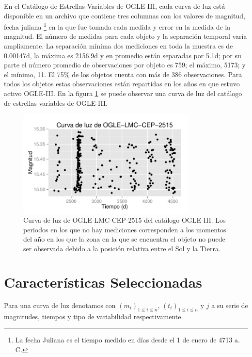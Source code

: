 \documentclass[letterpaper,12pt]{book}
\begin{document}
En el Catálogo de Estrellas Variables de OGLE-III, cada curva de luz está disponible en un archivo que contiene tres columnas con los valores de magnitud, fecha juliana \footnote{La fecha Juliana es el tiempo medido en días desde el 1 de enero de 4713 a. C.} en la que fue tomada cada medida y error en la medida de la magnitud. El número de medidas para cada objeto y la separación temporal varía ampliamente. La separación mínima dos mediciones en toda la muestra es de 0.00147d, la máxima es 2156.9d y en promedio están separadas por 5.1d; por su parte el número promedio de observaciones por objeto es 759; el máximo, 5173; y el mínimo,  11. El 75\% de los objetos cuenta con más de 386 observaciones. Para todos los objetos estas observaciones están repartidas en los años en que estuvo activo OGLE-III. En la figura \ref{fig:curvaDeLuz} se puede observar una curva de luz del catálogo de estrellas variables de OGLE-III.    


\begin{figure}
  \centering
  \includegraphics[width = 0.8\textwidth]{./img/C2Datos/curvaDeLuz.pdf}
  \caption{ Curva de luz de OGLE-LMC-CEP-2515 del catálogo OGLE-III. Los periodos en los que no hay mediciones corresponden a los momentos del año en los que la zona en la que se encuentra el objeto no puede ser observada debido a la posición relativa entre el Sol y la Tierra.}
  \label{fig:curvaDeLuz}
\end{figure}



\section{Características Seleccionadas \label{sec:atributos}}

Para una curva de luz denotamos con $(m_{i})_{1\leq i\leq n}$, $(t_{i})_{1\leq i\leq n}$ y $j$ a su serie de magnitudes, tiempos y tipo de variabilidad respectivamente.
\end{document}
